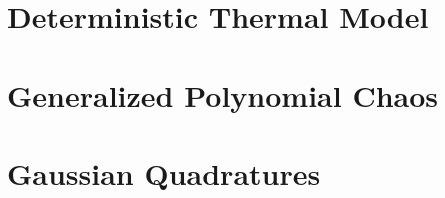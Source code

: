 \renewcommand{\thesection}{S\arabic{section}}
\renewcommand{\thetable}{S\arabic{table}}
\renewcommand{\thefigure}{S\arabic{figure}}
\setcounter{table}{0}
\setcounter{figure}{0}

\section{Deterministic Thermal Model} 


\section{Generalized Polynomial Chaos}   


\balance

\section{Gaussian Quadratures} 

